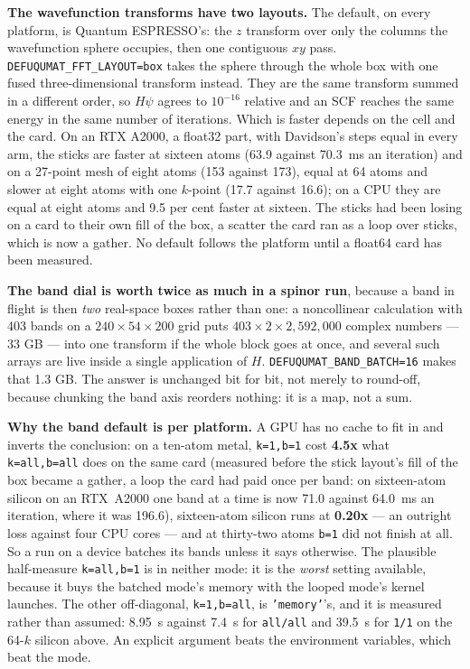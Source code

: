 \documentclass[11pt,a4paper]{article}
\newcommand{\qe}{Quantum ESPRESSO}
\newcommand{\code}[1]{\texttt{\small #1}}
\begin{document}
\textbf{The wavefunction transforms have two layouts.} The default, on every
platform, is \qe's: the $z$ transform over only the columns the wavefunction
sphere occupies, then one contiguous $xy$ pass.
\code{DEFUQUMAT\_FFT\_LAYOUT=box} takes the sphere through the whole box with one
fused three-dimensional transform instead. They are the same transform summed in
a different order, so $H\psi$ agrees to $10^{-16}$ relative and an SCF reaches the
same energy in the same number of iterations. Which is faster depends on the cell
and the card. On an RTX A2000, a float32 part, with Davidson's steps equal in every
arm, the sticks are faster at sixteen atoms (63.9 against 70.3~ms an iteration) and
on a 27-point mesh of eight atoms (153 against 173), equal at 64 atoms and slower at
eight atoms with one $k$-point (17.7 against 16.6); on a CPU they are equal at eight
atoms and 9.5 per cent faster at sixteen. The sticks had been losing on a card to
their own fill of the box, a scatter the card ran as a loop over sticks, which is
now a gather. No default follows the platform until a float64 card has been
measured.

\textbf{The band dial is worth twice as much in a spinor run}, because a band
in flight is then \emph{two} real-space boxes rather than one: a noncollinear
calculation with 403 bands on a $240\times54\times200$ grid puts
$403\times2\times2{,}592{,}000$ complex numbers --- 33 GB --- into one transform
if the whole block goes at once, and several such arrays are live inside a
single application of $H$. \code{DEFUQUMAT\_BAND\_BATCH=16} makes that 1.3 GB. The
answer is unchanged bit for bit, not merely to round-off, because chunking the
band axis reorders nothing: it is a map, not a sum.

\textbf{Why the band default is per platform.} A GPU has no cache to fit in and
inverts the conclusion: on a ten-atom metal, \code{k=1,b=1} cost \textbf{4.5x}
what \code{k=all,b=all} does on the same card (measured before the stick layout's
fill of the box became a gather, a loop the card had paid once per band: on
sixteen-atom silicon on an RTX~A2000 one band at a time is now 71.0 against
64.0~ms an iteration, where it was 196.6), sixteen-atom silicon runs at
\textbf{0.20x} --- an outright loss against four CPU cores --- and at
thirty-two atoms \code{b=1} did not finish at all. So a run on a device batches
its bands unless it says otherwise. The plausible half-measure
\code{k=all,b=1} is in neither mode: it is the \emph{worst} setting available,
because it buys the batched mode's memory with the looped mode's kernel
launches. The other off-diagonal, \code{k=1,b=all}, is \code{'memory'}'s, and
it is measured rather than assumed: 8.95~s against 7.4~s for \code{all/all} and
39.5~s for \code{1/1} on the 64-$k$ silicon above. An explicit argument beats
the environment variables, which beat the mode.
\end{document}
